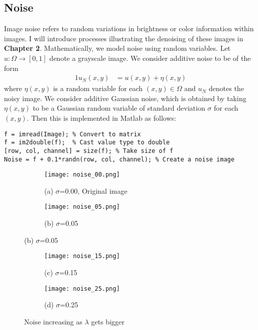 \documentclass[12pt]{report}
\begin{document}
\begin{tableofcontents}
            \section{Noise}
Image noise refers to random variations in brightness or color information within images. I will introduce processes illustrating the denoising of these images in \textbf{Chapter 2}. Mathematically, we model noise using random variables. Let $u:\Omega \to [0,1]$ denote a grayscale image. We consider additive noise to be of the form
			\begin{alignat*}{1}
		u_{N}(x,y) &= u(x,y) + \eta(x,y)
        	\end{alignat*}
where $\eta(x,y)$ is a random variable for each $(x,y) \in \Omega$ and $u_{N}$ denotes the noisy image. We consider additive Gaussian noise, which is obtained by taking $\eta(x,y)$ to be a Gaussian random variable of standard deviation $\sigma$ for each $(x,y)$. Then this is implemented in Matlab as follows:
\begin{lstlisting}
f = imread(Image); % Convert to matrix
f = im2double(f);  % Cast value type to double
[row, col, channel] = size(f); % Take size of f
Noise = f + 0.1*randn(row, col, channel); % Create a noise image
\end{lstlisting}
			\begin{figure}[ht]
				\captionsetup[subfigure]{labelformat=empty}
				\centering
				\begin{subfigure}{0.49\textwidth}
					\texttt{[image: noise\_00.png]}
					\caption{(a) $\sigma$=0.00, Original image}
				\end{subfigure}
				\begin{subfigure}{0.49\textwidth}
					\texttt{[image: noise\_05.png]}
					\caption{(b) $\sigma$=0.05}
				\end{subfigure}
			\end{figure}
            \begin{figure}[ht]
				\captionsetup[subfigure]{labelformat=empty}
                \centering
				\begin{subfigure}{0.49\textwidth}
					\texttt{[image: noise\_15.png]}
					\caption{(c) $\sigma$=0.15}
				\end{subfigure}
				\begin{subfigure}{0.49\textwidth}
					\texttt{[image: noise\_25.png]}
					\caption{(d) $\sigma$=0.25}
				\end{subfigure}
				\caption{Noise increasing as $\lambda$ gets bigger}
			\end{figure}


\end{tableofcontents}
\end{document}
